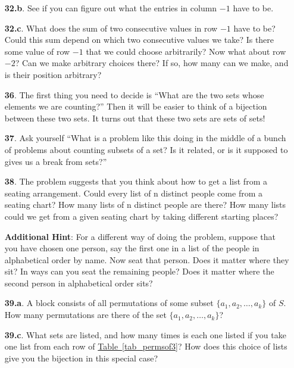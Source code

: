 \documentclass[10pt,]{book}
\theoremstyle{plain}
\theoremstyle{definition}
\theoremstyle{definition}
\numberwithin{equation}{chapter}
\begin{document}
\begin{itemize}[itemsep=1em]
\item[\textbf{32.b}.]See if you can figure out what the entries in column \(-1\) have to be.%

\item[\textbf{32.c}.]What does the sum of two consecutive values in row \(-1\) have to be? Could this sum depend on which two consecutive values we take? Is there some value of row \(-1\) that we could choose arbitrarily? Now what about row \(-2\)? Can we make arbitrary choices there? If so, how many can we make, and is their position arbitrary?%

\item[\textbf{36}.]The first thing you need to decide is ``What are the two sets whose elements we are counting?'' Then it will be easier to think of a bijection between these two sets. It turns out that these two sets are sets of sets!%

\item[\textbf{37}.]Ask yourself ``What is a problem like this doing in the middle of a bunch of problems about counting subsets of a set? Is it related, or is it supposed to gives us a break from sets?''%

\item[\textbf{38}.]The problem suggests that you think about how to get a list from a seating arrangement. Could every list of n distinct people come from a seating chart? How many lists of n distinct people are there? How many lists could we get from a given seating chart by taking different starting places?%

\par\smallskip
\noindent\textbf{Additional Hint}: For a different way of doing the problem, suppose that you have chosen one person, say the first one in a list of the people in alphabetical order by name. Now seat that person. Does it matter where they sit? In ways can you seat the remaining people? Does it matter where the second person in alphabetical order sits?%

\item[\textbf{39.a}.]A block consists of all permutations of some subset \(\{a_1 , a_2, \ldots, a_k \}\) of \(S\). How many permutations are there of the set \(\{a_1 , a_2, \ldots, a_k \}\)?%

\item[\textbf{39.c}.]What sets are listed, and how many times is each one listed if you take one list from each row of \hyperref[tab_permsof3]{Table~\ref{tab_permsof3}}? How does this choice of lists give you the bijection in this special case?%


\end{itemize}
\end{document}

